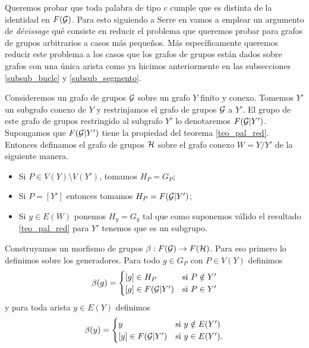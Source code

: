 \documentclass[tesis.tex]{subfiles}
\begin{document}
Queremos probar que toda palabra de tipo $c$ cumple que es distinta de la identidad en $F({\cal G})$. 
Para esto siguiendo a Serre en \cite{serre2002trees} vamos a emplear un argumento de \emph{dévissage} qué consiste en reducir el problema que queremos probar para grafos de grupos arbitrarios a casos más pequeños. 
Más específicamente queremos reducir este problema a los casos que los grafos de grupos están dados sobre grafos con una única arista como ya hicimos anteriormente en las subsecciones \ref{subsub_bucle} y \ref{subsub_segmento}.

Consideremos un grafo de grupos ${\cal G}$ sobre un grafo $Y$ finito y conexo. 
Tomemos $Y'$ un subgrafo conexo de $Y$ y restrinjamos el grafo de grupos ${\cal G}$ a $Y'$. 
El grupo de este grafo de grupos restringido al subgrafo $Y'$ lo denotaremos $F({\cal G} | Y')$.
Supongamos que $F({\cal G} | Y')$ tiene la propiedad del teorema \ref{teo_pal_red}.
Entonces definamos el grafo de grupos $\cal H$ sobre el grafo conexo $W=Y/Y'$ de la siguiente manera.
\begin{itemize}
	\item Si $P \in V(Y) \setminus V(Y')$, tomamos $H_P = G_P$;
	\item Si $P = [Y']$ entonces tomamos $H_P = F({\cal G} | Y')$;
	\item Si $y \in E(W)$ ponemos $H_y = G_y$ tal que como suponemos válido el resultado \ref{teo_pal_red} para $Y'$ tenemos que es un subgrupo.
\end{itemize}

Construyamos un morfismo de grupos $\beta:F({\cal G}) \to F({\cal H})$.
Para eso primero lo definimos sobre los generadores.
Para todo $g \in G_P$ con $P \in V(Y)$ definimos
\begin{equation*}
	\beta(g) = 
	\begin{cases}
		[g] \in H_P & \text{si} \ P \notin Y' \\
		[g] \in F({\cal G} | Y') & \text{si} \ P \in Y'  \\ 
	\end{cases}
\end{equation*}
y para toda arista $ y \in E(Y)$ definimos
\begin{equation*}
	\beta(y) = 
	\begin{cases}
		y  & \text{si} \ y \notin E(Y') \\
		[y] \in F({\cal G} | Y') & \text{si} \ y \in E(Y').  \\ 
	\end{cases}
\end{equation*}
\end{document}
